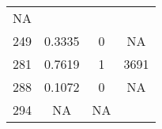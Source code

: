 \documentclass[]{article}
\begin{document}
\begin{longtable}[]{@{}cccc@{}}
\begin{minipage}[t]{0.17\columnwidth}
NA\strut
\end{minipage}\tabularnewline
\begin{minipage}[t]{0.10\columnwidth}\centering\strut
249\strut
\end{minipage} & \begin{minipage}[t]{0.25\columnwidth}\centering\strut
0.3335\strut
\end{minipage} & \begin{minipage}[t]{0.17\columnwidth}\centering\strut
0\strut
\end{minipage} & \begin{minipage}[t]{0.17\columnwidth}\centering\strut
NA\strut
\end{minipage}\tabularnewline
\begin{minipage}[t]{0.10\columnwidth}\centering\strut
281\strut
\end{minipage} & \begin{minipage}[t]{0.25\columnwidth}\centering\strut
0.7619\strut
\end{minipage} & \begin{minipage}[t]{0.17\columnwidth}\centering\strut
1\strut
\end{minipage} & \begin{minipage}[t]{0.17\columnwidth}\centering\strut
3691\strut
\end{minipage}\tabularnewline
\begin{minipage}[t]{0.10\columnwidth}\centering\strut
288\strut
\end{minipage} & \begin{minipage}[t]{0.25\columnwidth}\centering\strut
0.1072\strut
\end{minipage} & \begin{minipage}[t]{0.17\columnwidth}\centering\strut
0\strut
\end{minipage} & \begin{minipage}[t]{0.17\columnwidth}\centering\strut
NA\strut
\end{minipage}\tabularnewline
\begin{minipage}[t]{0.10\columnwidth}\centering\strut
294\strut
\end{minipage} & \begin{minipage}[t]{0.25\columnwidth}\centering\strut
NA\strut
\end{minipage} & \begin{minipage}[t]{0.17\columnwidth}\centering\strut
NA\strut
\end{minipage} & \begin{minipage}[t]{0.17\columnwidth}\centering\strut

\end{minipage}
\end{longtable}
\end{document}
